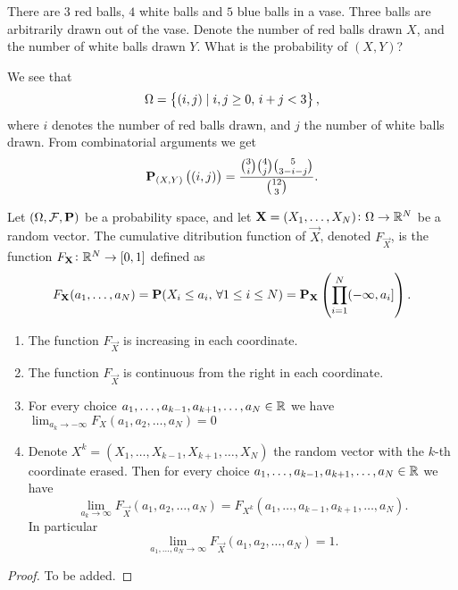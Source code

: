 \documentclass[11pt,a4paper]{article}
\begin{document}
  \begin{example}
    There are $3$ red balls, $4$ white balls and $5$ blue balls in a vase.
    Three balls are arbitrarily drawn out of the vase.
    Denote the number of red balls drawn $X$, and the number of white
    balls drawn $Y$. What is the probability of $(X,Y)$?

    We see that
    \[
      \Omega = \set{(i,j) \mid i,j \geq 0,\, i + j < 3},
    \]
    where $i$ denotes the number of red balls drawn, and $j$ the number
    of white balls drawn. From combinatorial arguments we get
    \[
      \mathbf{P}_{(X,Y)}\left((i,j)\right) =
      \frac{\binom{3}{i}\binom{4}{j}\binom{5}{3-i-j}}{\binom{12}{3}}.
    \]
  \end{example}

  \begin{definition}
    Let $(\Omega, \mathcal F, \mathbf{P})$ be a probability space, 
    and let $\boldsymbol{\mathbf{X}} = (X_1,\dots,X_N) \colon \Omega \to \mathbb{R}^N$ be a random vector.
    The cumulative ditribution function of $\vec{X}$, denoted $F_{\vec{X}}$, 
    is the function $F_{\boldsymbol{\mathbf{X}}} \colon \mathbb{R}^N \to [0,1]$ defined as
    \[
      F_{\boldsymbol{\mathbf{X}}}(a_1,\dots,a_N) =
      \mathbf{P}(X_i \le a_i,\, \forall 1 \le i \le N) =
      \mathbf{P}_{\boldsymbol{\mathbf{X}}}\left(\prod_{i=1}^{N}(-\infty,a_i]\right).
    \]
  \end{definition}

  \begin{proposition}
    \begin{enumerate}
      \item The function $F_{\vec{X}}$ is increasing in each coordinate.
      \item The function $F_{\vec{X}}$ is continuous from the right in each 
        coordinate.
      \item For every choice $a_1,\dots,a_{k-1},a_{k+1},\dots,a_N \in \mathbb{R}$
        we have $\lim_{a_k \to -\infty}{F_X(a_1,a_2,\dots,a_N)} = 0$
      \item Denote $X^k = (X_1,\dots,X_{k-1},X_{k+1},\dots,X_N)$ the random 
      vector with the $k$-th coordinate erased. 
      Then for every choice $a_1,\dots,a_{k-1},a_{k+1},\dots,a_N \in \mathbb{R}$
      we have
      \[
        \lim_{a_k \to \infty} F_{\vec{X}}(a_1,a_2,\dots,a_N) =
        F_{X^k}(a_1,\dots,a_{k-1},a_{k+1},\dots,a_N).
      \]
      In particular
      \[
        \lim_{a_1,\dots,a_N \to \infty} F_{\vec{X}}(a_1,a_2,\dots,a_N) = 1.
      \]
    \end{enumerate}
  \end{proposition}
  \begin{proof}
    To be added.
  \end{proof}
\end{document}
